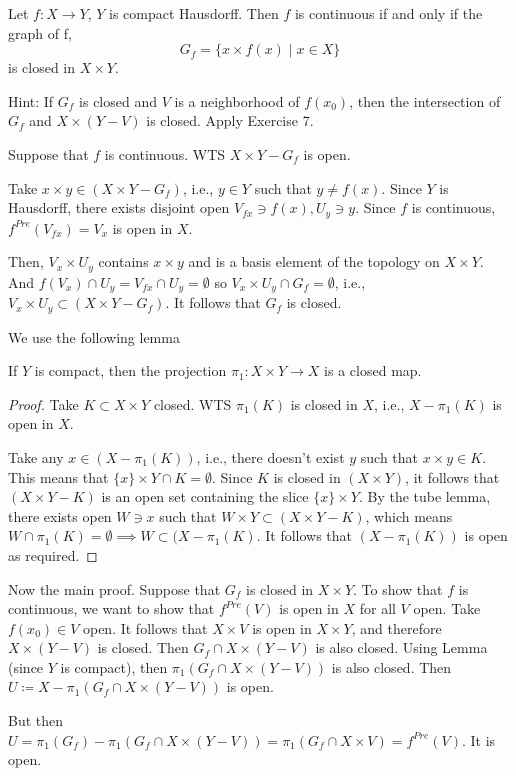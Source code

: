 \documentclass[a4paper, 12pt]{article}
\begin{document}
\begin{problem} 
    Let $f: X \to Y$, $Y$ is compact Hausdorff. Then $f$ is continuous if and only if the graph of f, \begin{equation*}
    G_f = \{x \times f(x) \mid x \in X\}
    \end{equation*}
    is closed in $X \times Y$.

    Hint: If $G_f$ is closed and $V$ is a neighborhood of $f(x_0)$, then the intersection of $G_f$ and $X \times (Y - V)$ is closed. Apply Exercise 7.
\end{problem}
\begin{solution}
    \pffwd Suppose that $f$ is continuous. WTS $X \times Y - G_f$ is open.

    Take $x \times y \in (X \times Y - G_f)$, i.e., $y \in Y$ such that $y \neq f(x)$. Since $Y$ is Hausdorff, there exists disjoint open $V_{fx} \ni f(x), U_y \ni y$. Since $f$ is continuous, $f^{Pre}(V_{fx}) = V_x$ is  open in $X$.

    Then, $V_x \times U_y$ contains $x \times y$ and is a basis element of the topology on $X \times Y$. And $f(V_x) \cap U_y = V_{fx} \cap U_y = \emptyset$ so $V_x \times U_y \cap G_f = \emptyset$, i.e., $V_x \times U_y \subset (X \times Y - G_f)$. It follows that $G_f$ is closed.

    \pfbwd  We use the following lemma
    \begin{lemma} [Exercise 7]
        If $Y$ is compact, then the projection $\pi_1: X \times Y \to X$ is a closed map.
    \end{lemma}
    \begin{proof}
        Take $K \subset X \times Y$ closed. WTS $\pi_1(K)$ is closed in $X$, i.e., $X - \pi_1(K)$ is open in $X$.

        Take any $x \in (X - \pi_1(K))$, i.e., there doesn't exist $y$ such that $x \times y \in K$. This means that $\{x\} \times Y \cap K = \emptyset$. Since $K$ is closed in $(X \times Y)$, it follows that $(X \times Y - K)$ is an open set containing the slice $\{x\} \times Y$. By the tube lemma, there exists open $W \ni x$ such that $W \times Y \subset (X \times Y - K)$, which means $W \cap \pi_1(K) = \emptyset \implies W \subset (X - \pi_1(K)$. It follows that $(X - \pi_1(K))$ is open as required.
    \end{proof}

    Now the main proof. Suppose that $G_f$ is closed in $X \times Y$. To show that $f$ is continuous, we want to show that $f^{Pre}(V)$ is open in $X$ for all $V$ open. Take $f(x_0) \in V$ open. It follows that $X \times V$ is open in $X \times Y$, and therefore $X \times (Y - V)$ is closed. Then $G_f \cap X \times (Y - V)$ is also closed. Using Lemma (since $Y$ is compact), then $\pi_1(G_f \cap X \times (Y - V))$ is also closed. Then $U \coloneqq X - \pi_1(G_f \cap X \times (Y - V)) $ is open.

    But then $U = \pi_1(G_f) - \pi_1(G_f \cap X \times (Y - V)) = \pi_1(G_f \cap X \times V) = f^{Pre}(V)$. It is open.
\end{solution}
\end{document}
